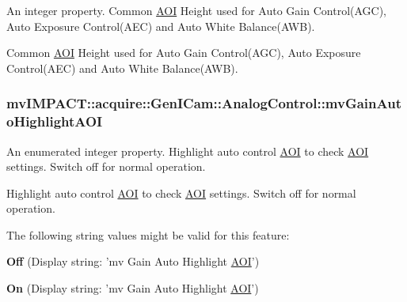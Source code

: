 An integer property. Common \hyperlink{struct_a_o_i}{A\+O\+I} Height used for Auto Gain Control(\+A\+G\+C), Auto Exposure Control(\+A\+E\+C) and Auto White Balance(\+A\+W\+B). 

Common \hyperlink{struct_a_o_i}{A\+O\+I} Height used for Auto Gain Control(\+A\+G\+C), Auto Exposure Control(\+A\+E\+C) and Auto White Balance(\+A\+W\+B). \hypertarget{classmv_i_m_p_a_c_t_1_1acquire_1_1_gen_i_cam_1_1_analog_control_aecf0b956ac5e1f86ae1caef0082fc5e1}{
\subsubsection[{mv\+Gain\+Auto\+Highlight\+A\+O\+I}]{ mv\+I\+M\+P\+A\+C\+T\+::acquire\+::\+Gen\+I\+Cam\+::\+Analog\+Control\+::mv\+Gain\+Auto\+Highlight\+A\+O\+I}}\label{classmv_i_m_p_a_c_t_1_1acquire_1_1_gen_i_cam_1_1_analog_control_aecf0b956ac5e1f86ae1caef0082fc5e1}


An enumerated integer property. Highlight auto control \hyperlink{struct_a_o_i}{A\+O\+I} to check \hyperlink{struct_a_o_i}{A\+O\+I} settings. Switch off for normal operation. 

Highlight auto control \hyperlink{struct_a_o_i}{A\+O\+I} to check \hyperlink{struct_a_o_i}{A\+O\+I} settings. Switch off for normal operation.

The following string values might be valid for this feature\+:
\begin{DoxyItemize}
\item {\bfseries Off} (Display string\+: 'mv Gain Auto Highlight \hyperlink{struct_a_o_i}{A\+O\+I}')
\item {\bfseries On} (Display string\+: 'mv Gain Auto Highlight \hyperlink{struct_a_o_i}{A\+O\+I}')
\end{DoxyItemize}

